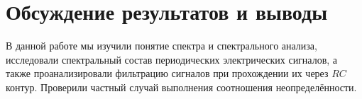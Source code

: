 \documentclass[a4paper,12pt]{article}
\theoremstyle{definition}
\begin{document}
\newpage



\section{Обсуждение результатов и выводы}

В данной работе мы изучили понятие спектра и спектрального анализа, исследовали спектральный состав периодических электрических сигналов, а также проанализировали фильтрацию сигналов при прохождении их через $RC$ контур. Проверили частный случай выполнения соотношения неопределённости.
\end{document}
